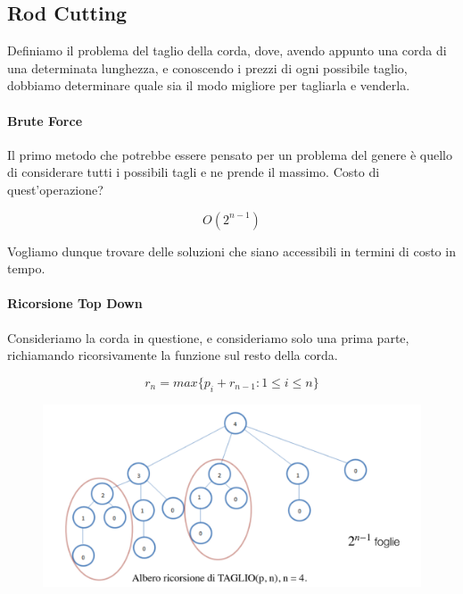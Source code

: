 \documentclass{article}
\begin{document}
\newpage

\subsection{Rod Cutting}

Definiamo il problema del taglio della corda, dove, avendo appunto una corda di una determinata lunghezza, e conoscendo i prezzi di ogni possibile taglio, dobbiamo determinare quale sia il modo migliore per tagliarla e venderla.

\paragraph{Brute Force} Il primo metodo che potrebbe essere pensato per un problema del genere è quello di considerare tutti i possibili tagli e ne prende il massimo. Costo di quest'operazione?

\begin{equation}
    O(2^{n-1})
\end{equation}

Vogliamo dunque trovare delle soluzioni che siano accessibili in termini di costo in tempo.

\paragraph{Ricorsione Top Down} Consideriamo la corda in questione, e consideriamo solo una prima parte, richiamando ricorsivamente la funzione sul resto della corda. 

\begin{equation}
    r_{n} = max \{ p_{i} + r_{n-1} : 1 \leq i \leq n \}
\end{equation}

\begin{figure}[htbp]
        \center
        \includegraphics[scale=0.35]{img/rodCutting1.png}
    \end{figure}
\end{document}
